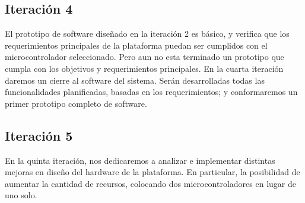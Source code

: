 \subsection{Iteración 4} %
\label{sub:iteracion_4}

El prototipo de software diseñado en la iteración 2 es básico, y verifica que los requerimientos principales de la plataforma puedan ser cumplidos con el microcontrolador seleccionado. Pero aun no esta terminado un prototipo que cumpla con los objetivos y requerimientos principales. En la cuarta iteración daremos un cierre al software del sistema. Serán desarrolladas todas las funcionalidades planificadas, basadas en los requerimientos; y conformaremos un primer prototipo completo de software.


\subsection{Iteración 5} %
\label{sub:iteracion_5}

En la quinta iteración, nos dedicaremos a analizar e implementar distintas mejoras en diseño del hardware de la plataforma. En particular, la posibilidad de aumentar la cantidad de recursos, colocando dos microcontroladores en lugar de uno solo.


